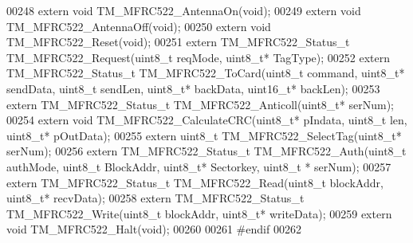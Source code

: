 \begin{DoxyCode}
00248 \textcolor{keyword}{extern} \textcolor{keywordtype}{void} TM\_MFRC522\_AntennaOn(\textcolor{keywordtype}{void});
00249 \textcolor{keyword}{extern} \textcolor{keywordtype}{void} TM\_MFRC522\_AntennaOff(\textcolor{keywordtype}{void});
00250 \textcolor{keyword}{extern} \textcolor{keywordtype}{void} TM\_MFRC522\_Reset(\textcolor{keywordtype}{void});
00251 \textcolor{keyword}{extern} TM\_MFRC522\_Status\_t TM\_MFRC522\_Request(uint8\_t reqMode, uint8\_t* TagType);
00252 \textcolor{keyword}{extern} TM\_MFRC522\_Status\_t TM\_MFRC522\_ToCard(uint8\_t command, uint8\_t* sendData, uint8\_t sendLen, uint8\_t* 
      backData, uint16\_t* backLen);
00253 \textcolor{keyword}{extern} TM\_MFRC522\_Status\_t TM\_MFRC522\_Anticoll(uint8\_t* serNum);
00254 \textcolor{keyword}{extern} \textcolor{keywordtype}{void} TM\_MFRC522\_CalculateCRC(uint8\_t* pIndata, uint8\_t len, uint8\_t* pOutData);
00255 \textcolor{keyword}{extern} uint8\_t TM\_MFRC522\_SelectTag(uint8\_t* serNum);
00256 \textcolor{keyword}{extern} TM\_MFRC522\_Status\_t TM\_MFRC522\_Auth(uint8\_t authMode, uint8\_t BlockAddr, uint8\_t* Sectorkey, uint8\_t
      * serNum);
00257 \textcolor{keyword}{extern} TM\_MFRC522\_Status\_t TM\_MFRC522\_Read(uint8\_t blockAddr, uint8\_t* recvData);
00258 \textcolor{keyword}{extern} TM\_MFRC522\_Status\_t TM\_MFRC522\_Write(uint8\_t blockAddr, uint8\_t* writeData);
00259 \textcolor{keyword}{extern} \textcolor{keywordtype}{void} TM\_MFRC522\_Halt(\textcolor{keywordtype}{void});
00260 
00261 \textcolor{preprocessor}{#endif}
00262 
\end{DoxyCode}
